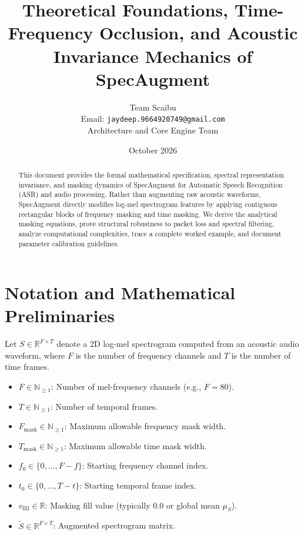 \documentclass[11pt,a4paper]{article}
\title{\textbf{Theoretical Foundations, Time-Frequency Occlusion, and Acoustic Invariance Mechanics of SpecAugment}}
\author{Team Scaibu \\ \small Email: \texttt{jaydeep.9664920749@gmail.com} \\ \small Architecture and Core Engine Team}
\date{October 2026}
\theoremstyle{definition}
\begin{document}
\maketitle

\begin{abstract}
This document provides the formal mathematical specification, spectral representation invariance, and masking dynamics of SpecAugment for Automatic Speech Recognition (ASR) and audio processing. Rather than augmenting raw acoustic waveforms, SpecAugment directly modifies log-mel spectrogram features by applying contiguous rectangular blocks of frequency masking and time masking. We derive the analytical masking equations, prove structural robustness to packet loss and spectral filtering, analyze computational complexities, trace a complete worked example, and document parameter calibration guidelines.
\end{abstract}

\section{Notation and Mathematical Preliminaries}

Let $S \in \mathbb{R}^{F \times T}$ denote a 2D log-mel spectrogram computed from an acoustic audio waveform, where $F$ is the number of frequency channels and $T$ is the number of time frames.

\begin{itemize}
    \item $F \in \mathbb{N}_{\ge 1}$: Number of mel-frequency channels (e.g., $F = 80$).
    \item $T \in \mathbb{N}_{\ge 1}$: Number of temporal frames.
    \item $F_{\text{mask}} \in \mathbb{N}_{\ge 1}$: Maximum allowable frequency mask width.
    \item $T_{\text{mask}} \in \mathbb{N}_{\ge 1}$: Maximum allowable time mask width.
    \item $f_0 \in \{0, \dots, F - f\}$: Starting frequency channel index.
    \item $t_0 \in \{0, \dots, T - t\}$: Starting temporal frame index.
    \item $v_{\text{fill}} \in \mathbb{R}$: Masking fill value (typically $0.0$ or global mean $\mu_S$).
    \item $\tilde{S} \in \mathbb{R}^{F \times T}$: Augmented spectrogram matrix.
\end{itemize}
\end{document}
